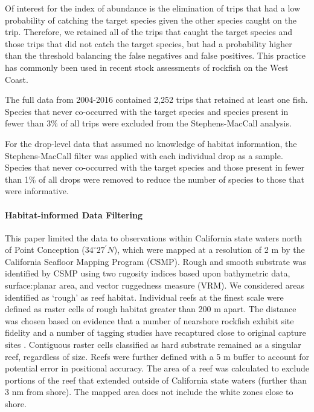 \documentclass[
  authoryear,
  preprint,
  3p]{elsarticle}
\let\oldparagraph\paragraph
\renewcommand{\paragraph}[1]{\oldparagraph{#1}\mbox{}}
\begin{document}
Of interest for the index of abundance is the elimination of trips that
had a low probability of catching the target species given the other
species caught on the trip. Therefore, we retained all of the trips that
caught the target species and those trips that did not catch the target
species, but had a probability higher than the threshold balancing the
false negatives and false positives. This practice has commonly been
used in recent stock assessments of rockfish on the West Coast.

The full data from 2004-2016 contained 2,252 trips that retained at
least one fish. Species that never co-occurred with the target species
and species present in fewer than 3\% of all trips were excluded from
the Stephens-MacCall analysis.

For the drop-level data that assumed no knowledge of habitat
information, the Stephens-MacCall filter was applied with each
individual drop as a sample. Species that never co-occurred with the
target species and those present in fewer than 1\% of all drops were
removed to reduce the number of species to those that were informative.

\hypertarget{habitat-informed-data-filtering}{%
\paragraph{Habitat-informed Data
Filtering}\label{habitat-informed-data-filtering}}

This paper limited the data to observations within California state
waters north of Point Conception (\(34^\circ 27^\prime N\)), which were
mapped at a resolution of 2 m by the California Seafloor Mapping Program
(CSMP). Rough and smooth substrate was identified by CSMP using two
rugosity indices based upon bathymetric data, surface:planar area, and
vector ruggedness measure (VRM). We considered areas identified as
`rough' as reef habitat. Individual reefs at the finest scale were
defined as raster cells of rough habitat greater than 200 m apart. The
distance was chosen based on evidence that a number of nearshore
rockfish exhibit site fidelity and a number of tagging studies have
recaptured close to original capture sites
\citep{Lea:1999:BAM, Matthews:1985:SSM, Hannah:2011:SF, Hannah:2012:UNC}.
Contiguous raster cells classified as hard substrate remained as a
singular reef, regardless of size. Reefs were further defined with a 5 m
buffer to account for potential error in positional accuracy. The area
of a reef was calculated to exclude portions of the reef that extended
outside of California state waters (further than 3 nm from shore). The
mapped area does not include the white zones close to shore.
\end{document}
